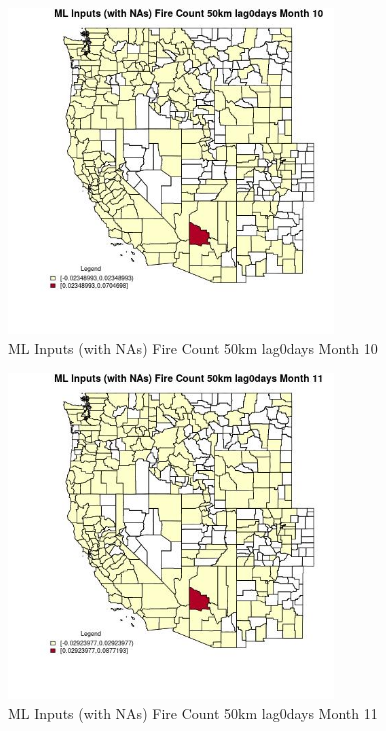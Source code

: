\begin{figure} 
\centering  
\includegraphics[width=0.77\textwidth]{Code_Outputs/Report_ML_input_PM25_Step4_part_e_de_duplicated_aves_compiled_2019-05-20wNAs_CountyFire_Count_50km_lag0daysmedianMonth10.jpg} 
\caption{\label{fig:Report_ML_input_PM25_Step4_part_e_de_duplicated_aves_compiled_2019-05-20wNAsCountyFire_Count_50km_lag0daysmedianMonth10}ML Inputs (with NAs) Fire Count 50km lag0days Month 10} 
\end{figure} 
 

\begin{figure} 
\centering  
\includegraphics[width=0.77\textwidth]{Code_Outputs/Report_ML_input_PM25_Step4_part_e_de_duplicated_aves_compiled_2019-05-20wNAs_CountyFire_Count_50km_lag0daysmedianMonth11.jpg} 
\caption{\label{fig:Report_ML_input_PM25_Step4_part_e_de_duplicated_aves_compiled_2019-05-20wNAsCountyFire_Count_50km_lag0daysmedianMonth11}ML Inputs (with NAs) Fire Count 50km lag0days Month 11} 
\end{figure} 
 

